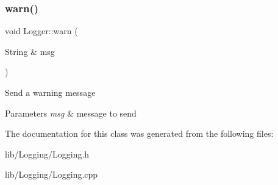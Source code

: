 \subsubsection{\texorpdfstring{warn()}{warn()}}
{\footnotesize\ttfamily void Logger\+::warn (\begin{DoxyParamCaption}\item[{String \&}]{msg }\end{DoxyParamCaption})}

Send a warning message 
\begin{DoxyParams}{Parameters}
{\em msg} & message to send \\
\hline
\end{DoxyParams}


The documentation for this class was generated from the following files\+:\begin{DoxyCompactItemize}
\item 
lib/\+Logging/Logging.\+h\item 
lib/\+Logging/Logging.\+cpp\end{DoxyCompactItemize}
